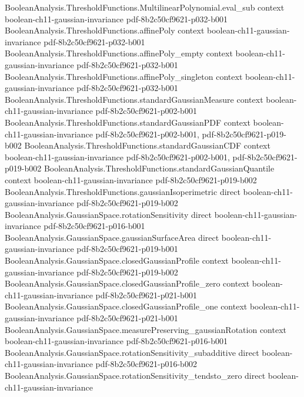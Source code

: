 \begin{lemma}
\proofstep
  {BooleanAnalysis.ThresholdFunctions.MultilinearPolynomial.eval_sub}
  {context}
  {boolean-ch11-gaussian-invariance}
  {pdf-8b2c50cf9621-p032-b001}
\proofstep
  {BooleanAnalysis.ThresholdFunctions.affinePoly}
  {context}
  {boolean-ch11-gaussian-invariance}
  {pdf-8b2c50cf9621-p032-b001}
\proofstep
  {BooleanAnalysis.ThresholdFunctions.affinePoly_empty}
  {context}
  {boolean-ch11-gaussian-invariance}
  {pdf-8b2c50cf9621-p032-b001}
\proofstep
  {BooleanAnalysis.ThresholdFunctions.affinePoly_singleton}
  {context}
  {boolean-ch11-gaussian-invariance}
  {pdf-8b2c50cf9621-p032-b001}
\proofstep
  {BooleanAnalysis.ThresholdFunctions.standardGaussianMeasure}
  {context}
  {boolean-ch11-gaussian-invariance}
  {pdf-8b2c50cf9621-p002-b001}
\proofstep
  {BooleanAnalysis.ThresholdFunctions.standardGaussianPDF}
  {context}
  {boolean-ch11-gaussian-invariance}
  {pdf-8b2c50cf9621-p002-b001,
    pdf-8b2c50cf9621-p019-b002}
\proofstep
  {BooleanAnalysis.ThresholdFunctions.standardGaussianCDF}
  {context}
  {boolean-ch11-gaussian-invariance}
  {pdf-8b2c50cf9621-p002-b001,
    pdf-8b2c50cf9621-p019-b002}
\proofstep
  {BooleanAnalysis.ThresholdFunctions.standardGaussianQuantile}
  {context}
  {boolean-ch11-gaussian-invariance}
  {pdf-8b2c50cf9621-p019-b002}
\proofstep
  {BooleanAnalysis.ThresholdFunctions.gaussianIsoperimetric}
  {direct}
  {boolean-ch11-gaussian-invariance}
  {pdf-8b2c50cf9621-p019-b002}
\proofstep
  {BooleanAnalysis.GaussianSpace.rotationSensitivity}
  {direct}
  {boolean-ch11-gaussian-invariance}
  {pdf-8b2c50cf9621-p016-b001}
\proofstep
  {BooleanAnalysis.GaussianSpace.gaussianSurfaceArea}
  {direct}
  {boolean-ch11-gaussian-invariance}
  {pdf-8b2c50cf9621-p019-b001}
\proofstep
  {BooleanAnalysis.GaussianSpace.closedGaussianProfile}
  {context}
  {boolean-ch11-gaussian-invariance}
  {pdf-8b2c50cf9621-p019-b002}
\proofstep
  {BooleanAnalysis.GaussianSpace.closedGaussianProfile_zero}
  {context}
  {boolean-ch11-gaussian-invariance}
  {pdf-8b2c50cf9621-p021-b001}
\proofstep
  {BooleanAnalysis.GaussianSpace.closedGaussianProfile_one}
  {context}
  {boolean-ch11-gaussian-invariance}
  {pdf-8b2c50cf9621-p021-b001}
\proofstep
  {BooleanAnalysis.GaussianSpace.measurePreserving_gaussianRotation}
  {context}
  {boolean-ch11-gaussian-invariance}
  {pdf-8b2c50cf9621-p016-b001}
\proofstep
  {BooleanAnalysis.GaussianSpace.rotationSensitivity_subadditive}
  {direct}
  {boolean-ch11-gaussian-invariance}
  {pdf-8b2c50cf9621-p016-b002}
\proofstep
  {BooleanAnalysis.GaussianSpace.rotationSensitivity_tendsto_zero}
  {direct}
  {boolean-ch11-gaussian-invariance}

\end{lemma}
